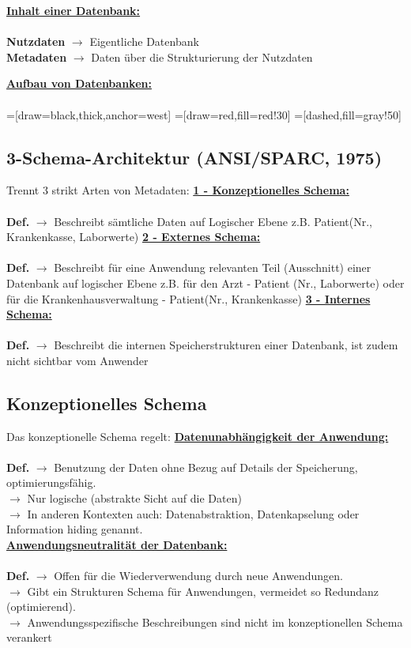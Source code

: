 \documentclass{article}
\newcommand{\KW}[1]{\indexspace\textbf{\underline{#1:}} \\}
\newcommand{\Def}[2]{\indexspace\textbf{\underline{#1:}} \\ \\\textbf{Def.} $\rightarrow$ {#2}}
\newcommand{\DApp}[2]{\textbf{#1} $\rightarrow$ {#2}}
\begin{document}
    \newpage %

    \KW{Inhalt einer Datenbank} \\
    \DApp{Nutzdaten}{Eigentliche Datenbank} \\
    \DApp{Metadaten}{Daten über die Strukturierung der Nutzdaten}
    
    \KW{Aufbau von Datenbanken} \\
    =[draw=black,thick,anchor=west]
    =[draw=red,fill=red!30]
    =[dashed,fill=gray!50]
    
    \subsection{3-Schema-Architektur (ANSI/SPARC, 1975)}
    Trennt 3 strikt Arten von Metadaten:
    \Def{1 - Konzeptionelles Schema}{Beschreibt sämtliche Daten auf Logischer Ebene z.B. Patient(Nr., Krankenkasse, Laborwerte)}
    \Def{2 - Externes Schema}{Beschreibt für eine Anwendung relevanten Teil (Ausschnitt) einer Datenbank auf logischer Ebene z.B. für den Arzt - Patient (Nr., Laborwerte) oder für die Krankenhausverwaltung - Patient(Nr., Krankenkasse)}
    \Def{3 - Internes Schema}{Beschreibt die internen Speicherstrukturen einer Datenbank, ist zudem nicht sichtbar vom Anwender}

    \subsection{Konzeptionelles Schema}
    Das konzeptionelle Schema regelt:
    \Def{Datenunabhängigkeit der Anwendung}{Benutzung der Daten ohne Bezug auf Details der Speicherung, optimierungsfähig.}\\
    \DApp{}{Nur logische (abstrakte Sicht auf die Daten)} \\
    \DApp{}{In anderen Kontexten auch: Datenabstraktion, Datenkapselung oder Information hiding genannt.} \\
    \Def{Anwendungsneutralität der Datenbank}{Offen für die Wiederverwendung durch neue Anwendungen.} \\
    \DApp{}{Gibt ein Strukturen Schema für Anwendungen, vermeidet so Redundanz (optimierend).} \\
    \DApp{}{Anwendungsspezifische Beschreibungen sind nicht im konzeptionellen Schema verankert}
\end{document}
